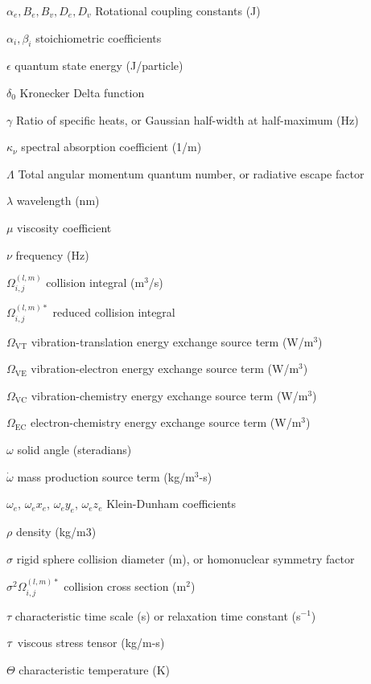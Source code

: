\begin{list}{}{%
\setlength{\labelwidth}{24mm}
\setlength{\leftmargin}{35mm}}
 \item[$\alpha_e,B_e,B_v,D_e,D_v$\dotfill] Rotational coupling constants (J)
 \item[$\alpha_i,\beta_i$\dotfill] stoichiometric coefficients
 \item[$\epsilon$\dotfill] quantum state energy (J/particle)
 \item[$\delta_{0}$\dotfill] Kronecker Delta function
 \item[$\gamma$\dotfill] Ratio of specific heats, or Gaussian half-width at half-maximum (Hz)
 \item[$\kappa_\nu$\dotfill] spectral absorption coefficient (1/m)
 \item[$\Lambda$\dotfill] Total angular momentum quantum number, or radiative escape factor
 \item[$\lambda$\dotfill] wavelength (nm)
 \item[$\mu$\dotfill] viscosity coefficient
 \item[$\nu$\dotfill] frequency (Hz)
 \item[$\Omega^{(l,m)}_{i,j}$\dotfill] collision integral (m$^3$/s)
 \item[$\Omega^{(l,m)\ast}_{i,j}$\dotfill] reduced collision integral
 \item[$\Omega_\text{VT}$\dotfill] vibration-translation energy exchange source term (W/m$^3$)
 \item[$\Omega_\text{VE}$\dotfill] vibration-electron energy exchange source term (W/m$^3$)
 \item[$\Omega_\text{VC}$\dotfill] vibration-chemistry energy exchange source term (W/m$^3$)
 \item[$\Omega_\text{EC}$\dotfill] electron-chemistry energy exchange source term (W/m$^3$)
 \item[$\omega$\dotfill] solid angle (steradians)
 \item[$\dot{\omega}$\dotfill] mass production source term (kg/m$^3$-s)
 \item[$\omega_e$, $\omega_e x_e$, $\omega_e y_e$, $\omega_e z_e$\dotfill] Klein-Dunham coefficients
 \item[$\rho$\dotfill] density (kg/m$3$)
 \item[$\sigma$\dotfill] rigid sphere collision diameter (m), or homonuclear symmetry factor
 \item[$\sigma^2 \Omega^{(l,m)\ast}_{i,j}$\dotfill] collision cross section (m$^2$)
 \item[$\tau$\dotfill] characteristic time scale (s) or relaxation time constant (s$^{-1}$)
 \item[$\tau$\dotfill] viscous stress tensor (kg/m-s)
 \item[$\Theta$\dotfill] characteristic temperature (K)
\end{list}
\medskip

